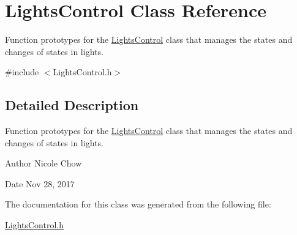\hypertarget{classLightsControl}{}\section{Lights\+Control Class Reference}
\label{classLightsControl}


Function prototypes for the \hyperlink{classLightsControl}{Lights\+Control} class that manages the states and changes of states in lights.  




{\ttfamily \#include $<$Lights\+Control.\+h$>$}



\subsection{Detailed Description}
Function prototypes for the \hyperlink{classLightsControl}{Lights\+Control} class that manages the states and changes of states in lights. 

\begin{DoxyAuthor}{Author}
Nicole Chow 
\end{DoxyAuthor}
\begin{DoxyDate}{Date}
Nov 28, 2017 
\end{DoxyDate}


The documentation for this class was generated from the following file\+:\begin{DoxyCompactItemize}
\item 
\hyperlink{LightsControl_8h}{Lights\+Control.\+h}\end{DoxyCompactItemize}
